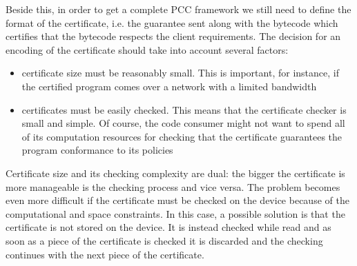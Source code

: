 Beside this, in order to get a complete PCC framework we still need to define the
format of the certificate, i.e. 
the guarantee sent along with the bytecode which certifies that the bytecode 
respects the client requirements. The decision for an encoding of the
certificate should take into account 
several factors:
\begin{itemize} 
  \item certificate size must be reasonably small. This is important, for
    instance,  if the certified program comes over a network 
    with a limited bandwidth
  \item certificates must be easily checked. This means that the certificate checker is  small and simple.
               Of course, the code consumer might not want to spend all of its computation 
              resources for checking that the certificate guarantees the
               program conformance to its policies   
\end{itemize}

Certificate size and its checking complexity are dual: the
bigger the certificate is more manageable is the checking 
process and vice versa.  The problem becomes even more difficult if the
certificate must be checked on the device because 
of the computational and space constraints. In this case, a possible solution
is that the certificate is not stored on the device. It is instead checked
while read and as soon as a piece  of the certificate is checked it is
discarded and the checking continues with the next piece of the certificate.
  
%  
% 
%        
%     


